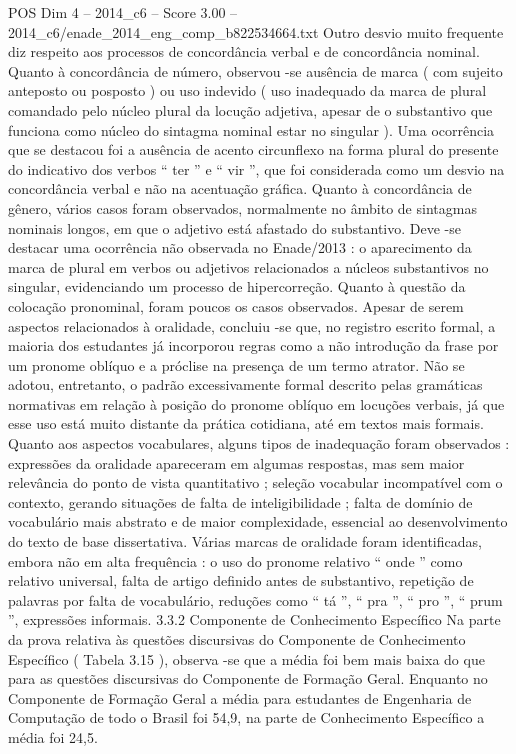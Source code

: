 \begin{textsample}{POS Dim 4 – 2014\_c6 – Score 3.00 – 2014\_c6/enade\_2014\_eng\_comp\_b822534664.txt}
Outro desvio muito frequente diz respeito aos processos de concordância verbal e de concordância nominal.
Quanto à concordância de número, observou -se ausência de marca ( com sujeito anteposto ou posposto ) ou uso indevido ( uso inadequado da marca de plural comandado pelo núcleo plural da locução adjetiva, apesar de o substantivo que funciona como núcleo do sintagma nominal estar no singular ).
Uma ocorrência que se destacou foi a ausência de acento circunflexo na forma plural do presente do indicativo dos verbos “ ter ” e “ vir ”, que foi considerada como um desvio na concordância verbal e não na acentuação gráfica.
Quanto à concordância de gênero, vários casos foram observados, normalmente no âmbito de sintagmas nominais longos, em que o adjetivo está afastado do substantivo.
Deve -se destacar uma ocorrência não observada no Enade/2013 : o aparecimento da marca de plural em verbos ou adjetivos relacionados a núcleos substantivos no singular, evidenciando um processo de hipercorreção.
Quanto à questão da colocação pronominal, foram poucos os casos observados.
Apesar de serem aspectos relacionados à oralidade, concluiu -se que, no registro escrito formal, a maioria dos estudantes já incorporou regras como a não introdução da frase por um pronome oblíquo e a próclise na presença de um termo atrator.
Não se adotou, entretanto, o padrão excessivamente formal descrito pelas gramáticas normativas em relação à posição do pronome oblíquo em locuções verbais, já que esse uso está muito distante da prática cotidiana, até em textos mais formais.
Quanto aos aspectos vocabulares, alguns tipos de inadequação foram observados : expressões da oralidade apareceram em algumas respostas, mas sem maior relevância do ponto de vista quantitativo ; seleção vocabular incompatível com o contexto, gerando situações de falta de inteligibilidade ; falta de domínio de vocabulário mais abstrato e de maior complexidade, essencial ao desenvolvimento do texto de base dissertativa.
Várias marcas de oralidade foram identificadas, embora não em alta frequência : o uso do pronome relativo “ onde ” como relativo universal, falta de artigo definido antes de substantivo, repetição de palavras por falta de vocabulário, reduções como “ tá ”, “ pra ”, “ pro ”, “ prum ”, expressões informais. 3.3.2 Componente de Conhecimento Específico Na parte da prova relativa às questões discursivas do Componente de Conhecimento Específico ( Tabela 3.15 ), observa -se que a média foi bem mais baixa do que para as questões discursivas do Componente de Formação Geral.
Enquanto no Componente de Formação Geral a média para estudantes de Engenharia de Computação de todo o Brasil foi 54,9, na parte de Conhecimento Específico a média foi 24,5.

\end{textsample}
